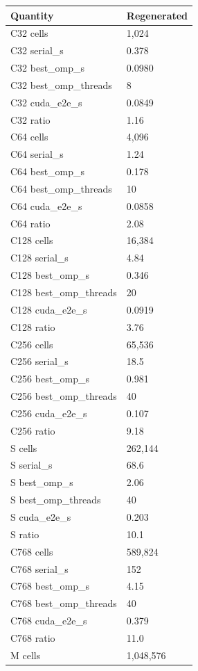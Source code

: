 \begin{tabular}{ll}
Quantity & Regenerated \\
\hline
C32 cells & 1,024 \\
C32 serial\_s & 0.378 \\
C32 best\_omp\_s & 0.0980 \\
C32 best\_omp\_threads & 8 \\
C32 cuda\_e2e\_s & 0.0849 \\
C32 ratio & 1.16 \\
C64 cells & 4,096 \\
C64 serial\_s & 1.24 \\
C64 best\_omp\_s & 0.178 \\
C64 best\_omp\_threads & 10 \\
C64 cuda\_e2e\_s & 0.0858 \\
C64 ratio & 2.08 \\
C128 cells & 16,384 \\
C128 serial\_s & 4.84 \\
C128 best\_omp\_s & 0.346 \\
C128 best\_omp\_threads & 20 \\
C128 cuda\_e2e\_s & 0.0919 \\
C128 ratio & 3.76 \\
C256 cells & 65,536 \\
C256 serial\_s & 18.5 \\
C256 best\_omp\_s & 0.981 \\
C256 best\_omp\_threads & 40 \\
C256 cuda\_e2e\_s & 0.107 \\
C256 ratio & 9.18 \\
S cells & 262,144 \\
S serial\_s & 68.6 \\
S best\_omp\_s & 2.06 \\
S best\_omp\_threads & 40 \\
S cuda\_e2e\_s & 0.203 \\
S ratio & 10.1 \\
C768 cells & 589,824 \\
C768 serial\_s & 152 \\
C768 best\_omp\_s & 4.15 \\
C768 best\_omp\_threads & 40 \\
C768 cuda\_e2e\_s & 0.379 \\
C768 ratio & 11.0 \\
M cells & 1,048,576 \\

\end{tabular}
